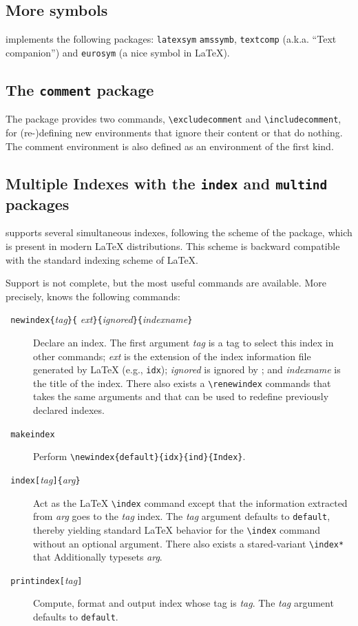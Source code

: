 \subsection{More symbols}
\hevea{} implements the following packages: \texttt{latexsym}
\texttt{amssymb}, \texttt{textcomp} (a.k.a. ``Text companion'')
and \texttt{eurosym} (a nice \texteuro{} symbol in \LaTeX).


\subsection{The \texttt{comment}\label{commentpack} package}
%
The  package provides two commands,
\verb+\excludecomment+ and \verb+\includecomment+, for (re-)defining
new environments that ignore their content or that do nothing. The
comment environment is also defined as an environment of the first
kind.



\subsection{Multiple Indexes with the \texttt{index} and
\texttt{multind}\label{multind} packages}
%
\hevea{} supports several simultaneous indexes, following the scheme
of the
 package,
which is present in modern \LaTeX{} distributions.
This scheme is backward compatible with the standard indexing scheme
of \LaTeX.

Support is not complete, but the most useful commands are available.
More precisely, \hevea{} knows the following commands:
\begin{description}
\item[{\tt{} newindex\{}{\it tag}{\tt \}\{}{\it
ext}{\tt\}\{}{\it ignored}{\tt\}\{}{\it indexname}{\tt\}}]
Declare an index.
The first argument {\it tag} is a tag to select this index in other
commands; {\it ext} is the extension of the index information file
generated by \LaTeX{} (e.g., \texttt{idx}); {\it ignored} is ignored by
\hevea{}; and {\it indexname} is the title of the index.
There also exists a
\verb+\renewindex+ commands that takes the same arguments and that can be
used to redefine previously declared indexes.
\item[{\tt{} makeindex}] Perform
\verb+\newindex{default}{idx}{ind}{Index}+.
\item[{\tt{} index[}{\it tag}{\tt]\{}{\it arg}{\tt\}}]
Act as the \LaTeX{} \verb+\index+ command except that the information
extracted from {\it arg} goes to the {\it tag} index.
The {\it tag} argument defaults to \verb+default+, thereby yielding
standard \LaTeX{} behavior for the \verb+\index+ command without an
optional argument.
There also exists a stared-variant \verb+\index*+ that Additionally
typesets {\it arg}.
\item[{\tt{} printindex[}{\it tag}{\tt]}] Compute, format and
output index whose tag is \textit{tag}. The {\it tag} argument
defaults to \verb+default+.
\end{description}

